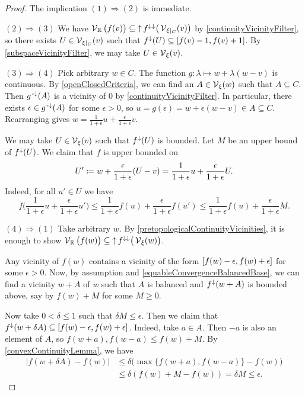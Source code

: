 \begin{proof}
The implication $(1) \Rightarrow (2)$ is immediate. 

$(2) \Rightarrow (3)$ 
We have $\operatorname{\mathcal{V}}_{\mathbb{R}}\big(f(v)\big) \subseteq \operatorname{\uparrow} f^{\downarrow\downarrow}\big(\operatorname{\mathcal{V}}_{\xi|_C}(v)\big)$ by \ref{continuityVicinityFilter}, so there exists $U\in \operatorname{\mathcal{V}}_{\xi|_C}(v)$ such that $f^\imf(U) \subseteq \interval{f(v)-1, f(v)+1}$. By \ref{subspaceVicinityFilter}, we may take $U\in \operatorname{\mathcal{V}}_\xi(v)$.

$(3) \Rightarrow (4)$ Pick arbitrary $w\in C$. The function $g: \lambda \mapsto w + \lambda(w-v)$ is continuous. By \ref{openClosedCriteria}, we can find an $A\in \operatorname{\mathcal{V}}_\xi(w)$ such that $A\subseteq C$. Then $g^{\text{\hspace{0.15em}-}\downarrow}(A)$ is a vicinity of $0$ by \ref{continuityVicinityFilter}. In particular, there exists $\epsilon \in g^{\text{\hspace{0.15em}-}\downarrow}(A)$ for some $\epsilon >0$, so $u = g(\epsilon) = w + \epsilon(w-v) \in A\subseteq C$. Rearranging gives $w = \frac{1}{1+\epsilon}u + \frac{\epsilon}{1+\epsilon}v$.

We may take $U\in\operatorname{\mathcal{V}}_\xi(v)$ such that $f^\downarrow(U)$ is bounded. Let $M$ be an upper bound of $f^\downarrow(U)$. We claim that $f$ is upper bounded on
\[ U' \coloneqq w + \frac{\epsilon}{1+\epsilon}(U-v) = \frac{1}{1+\epsilon}u + \frac{\epsilon}{1+\epsilon}U. \]
Indeed, for all $u'\in U$ we have
\[ f\Big(\frac{1}{1+\epsilon}u + \frac{\epsilon}{1+\epsilon}u'\Big) \leq \frac{1}{1+\epsilon}f(u) + \frac{\epsilon}{1+\epsilon}f(u') \leq \frac{1}{1+\epsilon}f(u) + \frac{\epsilon}{1+\epsilon}M. \]

$(4) \Rightarrow (1)$ Take arbitrary $w$. By \ref{pretopologicalContinuityVicinities}, it is enough to show $\operatorname{\mathcal{V}}_{\mathbb{R}}\big(f(w)\big) \subseteq \operatorname{\uparrow} f^{\downarrow\downarrow}\big(\operatorname{\mathcal{V}}_\xi(w)\big)$.

Any vicinity of $f(w)$ contains a vicinity of the form $\interval{f(w)-\epsilon, f(w)+\epsilon}$ for some $\epsilon >0$. Now, by assumption and \ref{equableConvergenceBalancedBase}, we can find a vicinity $w+A$ of $w$ such that $A$ is balanced and $f^\downarrow(w+A)$ is bounded above, say by $f(w)+M$ for some $M \geq 0$.

Now take $0 < \delta \leq 1$ such that $\delta M \leq \epsilon$. Then we claim that $f^\imf(w + \delta A) \subseteq \interval{f(w)-\epsilon, f(w)+\epsilon}$. Indeed, take $a\in A$. Then $-a$ is also an element of $A$, so $f(w+a), f(w-a)\leq f(w)+M$. By \ref{convexContinuityLemma}, we have
\begin{align*}
|f(w+\delta A) - f(w)| &\leq \delta \Big(\max\big\{ f(w+a), f(w-a) \big\} - f(w)\Big) \\
&\leq \delta(f(w) + M - f(w)) = \delta M \leq \epsilon.
\end{align*}
\end{proof}

